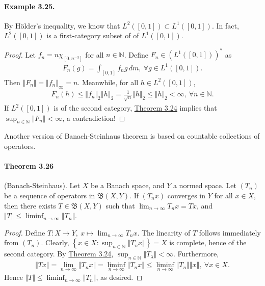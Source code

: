 \documentclass{article}
\begin{document}
\paragraph{Example 3.25.\label{example:3.25}} By Hölder's inequality, we know that $L^2([0,1])\subset L^1([0,1])$. In fact, $L^2([0,1])$ is a first-category subset of of $L^1([0,1])$.
\begin{proof}
	Let $f_n=n\chi_{[0,n^{-3}]}$ for all $n\in\mathbb{N}$. Define $F_n\in(L^1([0,1]))^*$ as
	\begin{align*}
		F_n(g) = \int_{[0,1]} f_ng\,dm,\ \forall g\in L^1([0,1]).
	\end{align*}
	Then $\Vert F_n\Vert = \Vert f_n\Vert_\infty=n$. Meanwhile, for all $h\in L^2([0,1])$,
	\begin{align*}
		F_n(h) \leq\Vert f_n\Vert_2\left\Vert h\right\Vert_2 = \frac{1}{\sqrt{n}}\Vert h\Vert_2 \leq\Vert h\Vert_2<\infty,\ \forall n\in\mathbb{N}.
	\end{align*}
	If $L^2([0,1])$ is of the second category, \hyperref[thm:3.24]{Theorem 3.24} implies that $\sup_{n\in\mathbb{N}}\Vert F_n\Vert < \infty$, a contradiction!
\end{proof}

Another version of Banach-Steinhaus theorem is based on countable collections of operators.

\paragraph{Theorem 3.26\label{thm:3.26}} (Banach-Steinhaus). Let $X$ be a Banach space, and  $Y$ a normed space. Let $(T_n)$ be a sequence of operators in $\mathfrak{B}(X,Y)$. If $(T_n x)$ converges in $Y$ for all $x\in X$, then there exists $T\in\mathfrak{B}(X,Y)$ such that $\lim_{n\to\infty} T_nx = Tx$, and $\Vert T\Vert\leq\liminf_{n\to\infty}\Vert T_n\Vert$.
\begin{proof}
Define $T:X\to Y,\ x\mapsto\lim_{n\to\infty}T_nx$. The linearity of $T$ follows immediately from $(T_n)$. Clearly, $\left\{x\in X:\sup_{n\in\mathbb{N}}\Vert T_n x\Vert\right\}=X$ is complete, hence of the second category. By \hyperref[thm:3.24]{Theorem 3.24}, $\sup_{n\in\mathbb{N}}\Vert T_\lambda\Vert < \infty$. Furthermore,
\begin{align*}
\Vert Tx\Vert = \lim_{n\to\infty}\Vert T_n x\Vert = \liminf_{n\to\infty}\Vert T_n x\Vert \leq\liminf_{n\to\infty}\Vert T_n\Vert\left\Vert x\right\Vert,\ \forall x\in X.
\end{align*}
Hence $\Vert T\Vert\leq\liminf_{n\to\infty}\Vert T_n\Vert$, as desired.
\end{proof}
\end{document}
